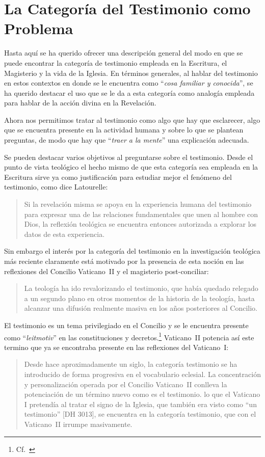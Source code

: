 \section{La Categoría del Testimonio como Problema}

Hasta aquí se ha querido ofrecer una descripción general del modo en que se
puede encontrar la categoría de testimonio empleada en la Escritura, el
Magisterio y la vida de la Iglesia. En términos generales, al hablar del
testimonio en estos contextos en donde se le encuentra como \enquote{\emph{cosa
    familiar y conocida}}, se ha querido destacar el uso que se le da a esta
categoría como analogía empleada para hablar de la acción divina en la
Revelación.

Ahora nos permitimos tratar al testimonio como algo que hay que esclarecer, algo
que se encuentra presente en la actividad humana y sobre lo que se plantean
preguntas, de modo que hay que \enquote{\emph{traer a la mente}} una explicación
adecuada.

Se pueden destacar varios objetivos al preguntarse sobre el testimonio. Desde el
punto de vista teológico el hecho mismo de que esta categoría sea empleada en la
Escritura sirve ya como justificación para estudiar mejor el fenómeno del
testimonio, como dice Latourelle:
\blockquote[{\cite[1523]{latourelle2000testimonio}}]{Si la revelación misma se
  apoya en la experiencia humana del testimonio para expresar una de las
  relaciones fundamentales que unen al hombre con Dios, la reflexión teológica
  se encuentra entonces autorizada a explorar los datos de esta experiencia.}
Sin embargo el interés por la categoría del testimonio en la investigación
teológica más reciente claramente está motivado por la presencia de esta noción
en las reflexiones del Concilio Vaticano~II y el magisterio post-conciliar:
\blockquote[{\cite[81]{prades2015testimonio}}]{La teología ha ido revalorizando
  el testimonio, que había quedado relegado a un segundo plano en otros momentos
  de la historia de la teología, hasta alcanzar una difusión realmente masiva en
  los años posteriores al Concilio.}
El testimonio es un tema privilegiado en el Concilio y se le encuentra presente
como \enquote{\emph{leitmotiv}} en las constituciones y
decretos.\footnote{Cf.~\cite[1523]{latourelle2000testimonio}} Vaticano~II
potencia así este termino que ya se encontraba presente en las reflexiones del
Vaticano~I:
\blockquote[{\cite[572]{ninot2009tf}}]{Desde hace aproximadamente un siglo, la
  categoría testimonio se ha introducido de forma progresiva en el vocabulario
  eclesial. La concentración y personalización operada por el Concilio
  Vaticano~II conlleva la potenciación de un término nuevo como es el
  testimonio. \textelp{} lo que el Vaticano I pretendía al tratar el signo de la
  Iglesia, que también era visto como ``un testimonio'' [DH 3013], se encuentra
  en la categoría testimonio, que con el Vaticano~II irrumpe masivamente.}

